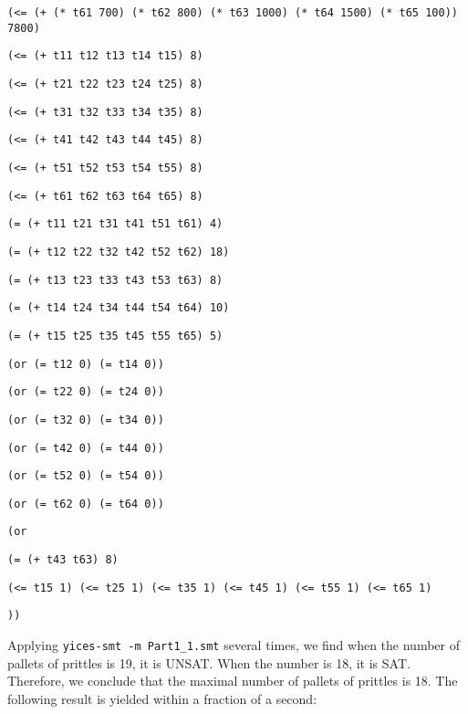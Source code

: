 \documentclass[11pt]{article}
\begin{document}
{{\tt (<= (+ (* t61 700) (* t62 800) (* t63 1000) (* t64 1500) (* t65 100)) 7800) }

{\tt (<= (+ t11 t12 t13 t14 t15) 8)}

{\tt (<= (+ t21 t22 t23 t24 t25) 8)}

{\tt (<= (+ t31 t32 t33 t34 t35) 8)}

{\tt (<= (+ t41 t42 t43 t44 t45) 8)}

{\tt (<= (+ t51 t52 t53 t54 t55) 8)}

{\tt (<= (+ t61 t62 t63 t64 t65) 8)}

{\tt (= (+ t11 t21 t31 t41 t51 t61) 4)}

{\tt (= (+ t12 t22 t32 t42 t52 t62) 18)}

{\tt (= (+ t13 t23 t33 t43 t53 t63) 8)}

{\tt (= (+ t14 t24 t34 t44 t54 t64) 10)}

{\tt (= (+ t15 t25 t35 t45 t55 t65) 5)}

{\tt (or (= t12 0) (= t14 0)) }

{\tt (or (= t22 0) (= t24 0)) }

{\tt (or (= t32 0) (= t34 0)) }

{\tt (or (= t42 0) (= t44 0)) }

{\tt (or (= t52 0) (= t54 0)) }

{\tt (or (= t62 0) (= t64 0)) }

{\tt (or}

{\tt (= (+ t43 t63) 8) }

{\tt (<= t15 1) (<= t25 1) (<= t35 1) (<= t45 1) (<= t55 1) (<= t65 1)}

{\tt )) }
}

Applying {\tt yices-smt -m Part1\_1.smt} several times, we find when the number of pallets of prittles is 19, it is UNSAT. When the number is 18, it is SAT. Therefore, we conclude that the maximal number of pallets of prittles is 18.
The following result is yielded within a fraction of a second:
\end{document}

